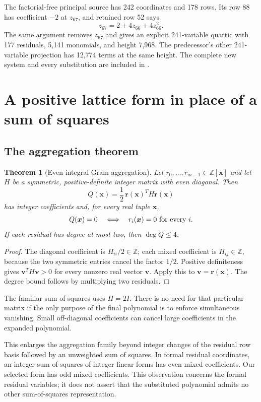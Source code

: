 \documentclass[11pt]{article}
\newtheorem{theorem}{Theorem}[section]
\theoremstyle{remark}\newtheorem{remark}[theorem]{Remark}
\newcommand{\Z}{\mathbb Z}
\newcommand{\code}[1]{\texttt{\detokenize{#1}}}
\begin{document}
The factorial-free principal source has 242 coordinates and 178 rows.
Its row 88 has coefficient $-2$ at $z_{67}$, and retained row 52 says
\[
z_{67}=2+4z_{66}+4z_{66}^2.
\]
The same argument removes $z_{67}$ and gives an explicit 241-variable
quartic with 177 residuals, 5,141 monomials, and height 7,968.
The predecessor's other 241-variable projection has 12,774 terms at
the same height. The complete new system and every substitution are
included in \code{projection/factorialfree241/}.

\section{A positive lattice form in place of a sum of squares}\label{sec:gram}

\subsection{The aggregation theorem}

\begin{theorem}[Even integral Gram aggregation]\label{thm:gram}
Let $r_0,\ldots,r_{m-1}\in\Z[\boldsymbol x]$ and let $H$ be a symmetric,
positive-definite integer matrix with even diagonal. Then
\[
Q(\boldsymbol x)=\frac12\,\boldsymbol r(\boldsymbol x)^T
H\boldsymbol r(\boldsymbol x)
\]
has integer coefficients and, for every real tuple $\boldsymbol x$,
\[
Q(\boldsymbol x)=0
\quad\Longleftrightarrow\quad
r_i(\boldsymbol x)=0\ \hbox{for every }i.
\]
If each residual has degree at most two, then $\deg Q\le4$.
\end{theorem}

\begin{proof}
The diagonal coefficient is $H_{ii}/2\in\Z$; each mixed coefficient is
$H_{ij}\in\Z$, because the two symmetric entries cancel the factor $1/2$.
Positive definiteness gives $\boldsymbol v^TH\boldsymbol v>0$ for every
nonzero real vector $\boldsymbol v$. Apply this to
$\boldsymbol v=\boldsymbol r(\boldsymbol x)$. The degree bound follows
by multiplying two residuals.
\end{proof}

The familiar sum of squares uses $H=2I$. There is no need for that
particular matrix if the only purpose of the final polynomial is to
enforce simultaneous vanishing. Small off-diagonal coefficients can cancel
large coefficients in the expanded polynomial.

This enlarges the aggregation family beyond integer changes of the
residual row basis followed by an unweighted sum of squares. In formal
residual coordinates, an integer sum of squares of integer linear forms
has even mixed coefficients. Our selected form has odd mixed coefficients.
This observation concerns the formal residual variables; it does not
assert that the substituted polynomial admits no other sum-of-squares
representation.
\end{document}
